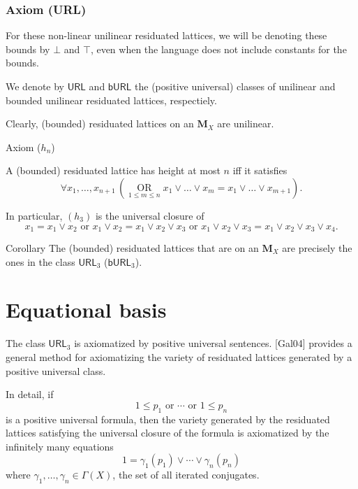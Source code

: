 \documentclass[professionalfont, 10pt]{beamer} %
\theoremstyle{plain}
\theoremstyle{definition}
\DeclareMathOperator*{\bigor}{OR}
\begin{document}
\begin{frame}
\frametitle{Axiom (URL)}
    For these non-linear unilinear residuated lattices, we will be denoting these bounds by $\bot$ and $\top$, even when the language does not include constants for the bounds.\pause
    
    We denote by $\mathsf{URL}$ and $\mathsf{bURL}$ the (positive universal) classes of unilinear and bounded unilinear residuated lattices, respectiely.\pause
    
    Clearly, (bounded) residuated lattices on an $\mathbf{M}_X$ are unilinear.
\end{frame}

\begin{frame}{Axiom ($h_n$)}

    A (bounded) residuated lattice has height at most $n$ iff it satisfies
    \begin{equation}\tag{$h_n$}\label{axiom_of_finite_height}
            \forall x_1, \dots, x_{n+1} \, (\bigor \limits_{1 \leq m \leq n}
            x_1 \vee \dots \vee x_{m} = x_1 \vee \dots \vee x_{m+1}).
    \end{equation}

    In particular, $(h_3)$ is the universal closure of 
    $$x_1 = x_1 \vee x_2 \text{ or } x_1 \vee x_2 = x_1 \vee x_2 \vee x_3 \text{ or } x_1 \vee x_2 \vee x_3 = x_1 \vee x_2 \vee x_3 \vee x_4.$$

    \pause

    \begin{block}{Corollary}
        The (bounded) residuated lattices that are on an $\mathbf{M}_X$ are precisely the ones in the class $\mathsf{URL}_3$ ($\mathsf{bURL}_3$).
    \end{block}
\end{frame}

\section{Equational basis}

\begin{frame}
    The class $\mathsf{URL}_3$ is axiomatized by positive universal sentences.\pause
    {[Gal04]} provides a general method for axiomatizing the variety of residuated lattices generated by a positive universal class.\pause
    
    In detail, if $$1 \leq p_1 \text{ or } \cdots \text{ or } 1 \leq p_n$$ is a positive universal formula, \pause then the variety generated by the residuated lattices satisfying the universal closure of the formula is axiomatized by the infinitely many equations
    $$1 = \gamma_1(p_1) \vee \cdots \vee \gamma_n (p_n)$$
    where $ \gamma_1, \ldots,\gamma_n \in \Gamma(X)$, the set of all iterated conjugates.    
\end{frame}
\end{document}
